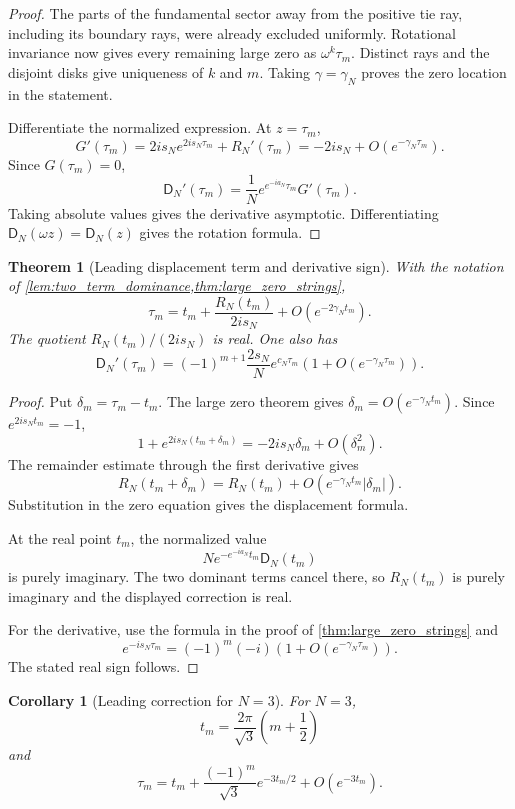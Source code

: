\documentclass[11pt,letterpaper]{article}
\newtheorem{theorem}{Theorem}[section]
\newtheorem{corollary}[corollary]{Corollary}
\theoremstyle{definition}
\theoremstyle{remark}
\newcommand{\Dfun}{\mathsf D}
\begin{document}
\begin{proof}
The parts of the fundamental sector away from the positive tie ray,
including its boundary rays, were already excluded uniformly.
Rotational invariance now gives every remaining large zero as
$\omega^k\tau_m$.  Distinct rays and the disjoint disks give uniqueness
of $k$ and $m$.  Taking $\gamma=\gamma_N$ proves the zero location in
the statement.

Differentiate the normalized expression.  At $z=\tau_m$,
\[
G'(\tau_m)
=
2is_Ne^{2is_N\tau_m}+R_N'(\tau_m)
=
-2is_N+O(e^{-\gamma_N\tau_m}).
\]
Since $G(\tau_m)=0$,
\[
\Dfun_N'(\tau_m)
=
\frac1N e^{e^{-ia_N}\tau_m}G'(\tau_m).
\]
Taking absolute values gives the derivative asymptotic.  Differentiating $\Dfun_N(\omega z)=\Dfun_N(z)$ gives the rotation formula.
\end{proof}

\begin{theorem}[Leading displacement term and derivative sign]\label{thm:first_zero_correction}
With the notation of \cref{lem:two_term_dominance,thm:large_zero_strings},
\[
\tau_m
=
t_m+
\frac{R_N(t_m)}{2is_N}
+
O(e^{-2\gamma_Nt_m}).
\]
The quotient $R_N(t_m)/(2is_N)$ is real.  One also has
\[
\Dfun_N'(\tau_m)
=
(-1)^{m+1}
\frac{2s_N}{N}
e^{c_N\tau_m}
\left(1+O(e^{-\gamma_N\tau_m})\right).
\]
\end{theorem}

\begin{proof}
Put $\delta_m=\tau_m-t_m$.  The large zero theorem gives $\delta_m=O(e^{-\gamma_Nt_m})$.  Since $e^{2is_Nt_m}=-1$,
\[
1+e^{2is_N(t_m+\delta_m)}
=
-2is_N\delta_m+O(\delta_m^2).
\]
The remainder estimate through the first derivative gives
\[
R_N(t_m+\delta_m)
=
R_N(t_m)+O(e^{-\gamma_Nt_m}|\delta_m|).
\]
Substitution in the zero equation gives the displacement formula.

At the real point $t_m$, the normalized value
\[
N e^{-e^{-ia_N}t_m}\Dfun_N(t_m)
\]
is purely imaginary.  The two dominant terms cancel there, so $R_N(t_m)$ is purely imaginary and the displayed correction is real.

For the derivative, use the formula in the proof of \cref{thm:large_zero_strings} and
\[
e^{-is_N\tau_m}
=
(-1)^m(-i)
\left(1+O(e^{-\gamma_N\tau_m})\right).
\]
The stated real sign follows.
\end{proof}

\begin{corollary}[Leading correction for $N=3$]\label{cor:N3_zero_correction}
For $N=3$,
\[
t_m=\frac{2\pi}{\sqrt3}\left(m+\frac12\right)
\]
and
\[
\tau_m
=
t_m+
\frac{(-1)^m}{\sqrt3}e^{-3t_m/2}
+
O(e^{-3t_m}).
\]
\end{corollary}
\end{document}
